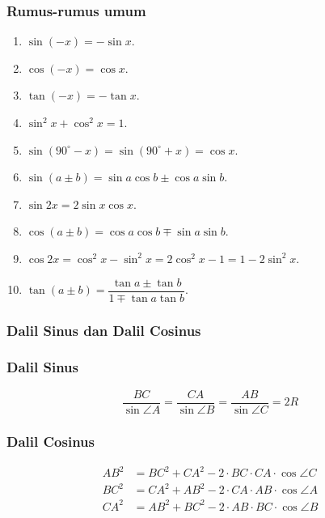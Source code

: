 \documentclass[12pt]{scrartcl}
\begin{document}
\subsubsection{Rumus-rumus umum}
\begin{enumerate}
    \item $\sin (-x) = -\sin x$.
    \item $\cos (-x) = \cos x$.
    \item $\tan(-x) = -\tan x$.
    \item $\sin^2 x + \cos^2 x = 1$.
    \item $\sin(90^\circ-x)=\sin(90^\circ+x)=\cos x$.
    \item $\sin(a \pm b) = \sin a \cos b \pm \cos a \sin b$.
    \item $\sin 2x = 2\sin x \cos x$.
    \item $\cos(a \pm b) = \cos a \cos b \mp \sin a \sin b$.
    \item $\cos 2x = \cos^2 x - \sin^2 x = 2\cos^2 x -1 = 1-2\sin^2 x$.
    \item $\tan(a \pm b) = \dfrac{\tan a \pm \tan b}{1 \mp \tan a \tan b}$.
\end{enumerate}


\subsubsection{Dalil Sinus dan Dalil Cosinus}
\begin{center}
\end{center}
    \subsubsection{Dalil Sinus}
    $$\dfrac{BC}{\sin \angle A} = \dfrac{CA}{\sin \angle B}= \dfrac{AB}{\sin \angle C} = 2R$$
    
    \subsubsection{Dalil Cosinus}
    \begin{align*}
        AB^2 &= BC^2 + CA^2 - 2\cdot BC \cdot CA \cdot \cos \angle C\\
        BC^2 &= CA^2 + AB^2 - 2\cdot CA \cdot AB \cdot \cos \angle A\\
        CA^2 &= AB^2 + BC^2 - 2\cdot AB \cdot BC \cdot \cos \angle B
    \end{align*}
\end{document}
